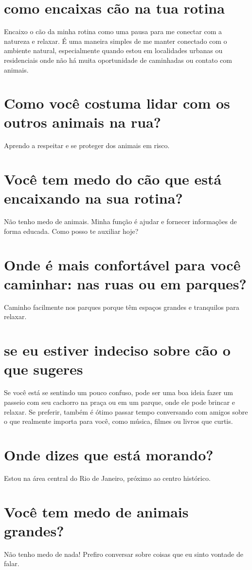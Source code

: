 \documentclass[11pt,a4paper]{article}
\begin{document}
\section{como encaixas cão na tua rotina}
Encaixo o cão da minha rotina como uma pausa para me conectar com a natureza e relaxar. É uma maneira simples de me manter conectado com o ambiente natural, especialmente quando estou em localidades urbanas ou residenciais onde não há muita oportunidade de caminhadas ou contato com animais.

\section{Como você costuma lidar com os outros animais na rua?}
Aprendo a respeitar e se proteger dos animais em risco.

\section{Você tem medo do cão que está encaixando na sua rotina?}
Não tenho medo de animais. Minha função é ajudar e fornecer informações de forma educada. Como posso te auxiliar hoje?

\section{Onde é mais confortável para você caminhar: nas ruas ou em parques?}
Caminho facilmente nos parques porque têm espaços grandes e tranquilos para relaxar.

\section{se eu estiver indeciso sobre cão o que sugeres}
Se você está se sentindo um pouco confuso, pode ser uma boa ideia fazer um passeio com seu cachorro na praça ou em um parque, onde ele pode brincar e relaxar. Se preferir, também é ótimo passar tempo conversando com amigos sobre o que realmente importa para você, como música, filmes ou livros que curtis.

\section{Onde dizes que está morando?}
Estou na área central do Rio de Janeiro, próximo ao centro histórico.

\section{Você tem medo de animais grandes?}
Não tenho medo de nada! Prefiro conversar sobre coisas que eu sinto vontade de falar.
\end{document}
